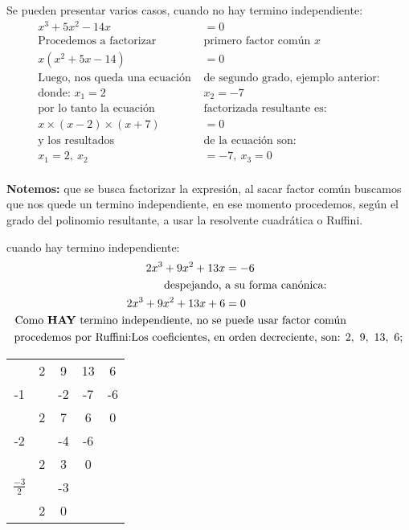 \documentclass[12pt]{article}
\begin{document}
    Se pueden presentar varios casos, cuando no hay termino independiente:
    \begin{align*}
        x^3 + 5x^2 -14x &=0 		\\
        \text{Procedemos a factorizar} &\text{primero factor común }x \\
        x(x^2 + 5x -14)&=0\\
        \text{Luego, nos queda una ecuación }& \text{de segundo grado, ejemplo anterior:}\\
        \text{donde: }  x_1 = 2 &  x_2 = -7\\
        \text{por lo tanto la ecuación} & \text{factorizada resultante es:}\\
        x\times(x-2)\times(x+7)&= 0\\
        \text{y los resultados}& \text{de la ecuación son: } \\
        x_1= 2,\ x_2&=-7,\ x_3=0\\
    \end{align*}

    \textbf{Notemos:} que se busca factorizar la expresión, al sacar factor común
    buscamos que nos quede un termino independiente, en ese momento procedemos,
    según el grado del polinomio resultante, a usar la resolvente cuadrática o
    Ruffini.

    cuando hay termino independiente:
    \begin{align*}
        2x^3+9x^2+13x &= -6\\
        \text{despejando, }& \text{a su forma canónica:}   \\
        2x^3+9x^2+13x+6 &= 0\\
        \text{Como \textbf{HAY} termino independiente, no se }& \text{puede usar factor común} \\
        \text{procedemos por Ruffini:Los coeficientes, en}& \text{ orden decreciente, son: } 2,\ 9,\ 13,\ 6;
    \end{align*}

\begin{center}
     \begin{tabular}{c|cccc}
            &  2&  9&  13&  6\\
        -1  &   & -2&  -7& -6\\\hline
            &  2&  7&   6&  0\\
        -2  &   & -4&  -6\\\hline
            &  2&  3&   0\\
$\frac{-3}{2}$&   & -3&  \\\hline
            & 2 & 0
    \end{tabular}
\end{center}
\end{document}
